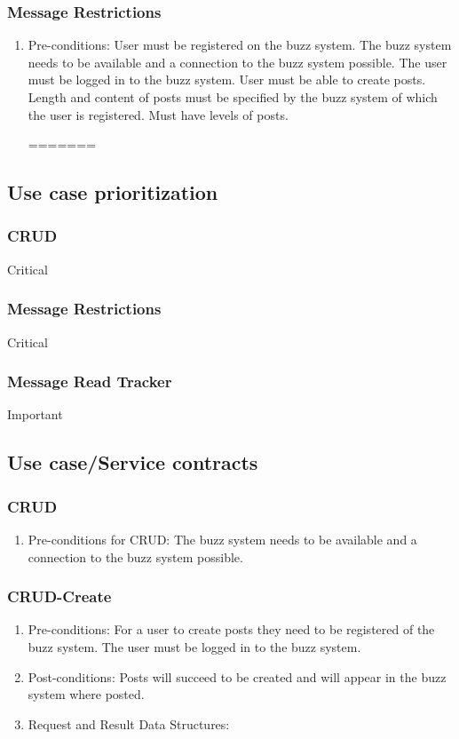 \documentclass[12pt, oneside]{book}
\begin{document}
\subsubsection{Message Restrictions}
\begin{enumerate}
 \item Pre-conditions:  User must be registered on the buzz system. The buzz system needs to be available and a connection to the buzz system possible. The user must be logged in to the buzz system. User must be able to create posts. Length and content of posts must be specified by the buzz system of which the user is registered. Must have levels of posts.
 
=======
 
\end{enumerate}

\subsection{Use case prioritization}
\subsubsection{CRUD}
Critical
\subsubsection{Message Restrictions}
Critical
\subsubsection{Message Read Tracker}
Important
\subsection{Use case/Service contracts}
\subsubsection{CRUD}
\begin{enumerate}
 \item Pre-conditions for CRUD: The buzz system needs to be available and a connection to the buzz system possible. 
\end{enumerate}
\subsubsection{CRUD-Create}
\begin{enumerate}
 \item Pre-conditions: For a user to create posts they need to be registered of the buzz system. The user must be logged in to the buzz system.
 \\
 \item Post-conditions: Posts will succeed to be created and will appear in the buzz system where posted.
  \\
 \item Request and Result Data Structures: 
\end{enumerate}
\end{document}
